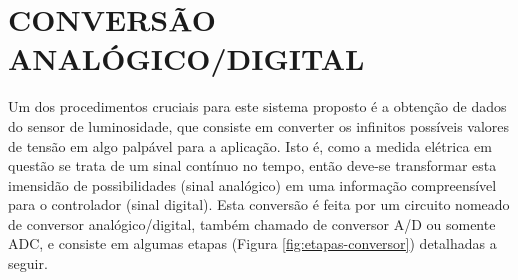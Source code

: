 \documentclass[oneside,openright,12pt]{ufsm_2015} %
\begin{document}


\section{CONVERSÃO ANALÓGICO/DIGITAL}
Um dos procedimentos cruciais para este sistema proposto é a obtenção de dados do sensor de luminosidade, que consiste em converter os infinitos possíveis valores de tensão em algo palpável para a aplicação. Isto é, como a medida elétrica em questão se trata de um sinal contínuo no tempo, então deve-se transformar esta imensidão de possibilidades (sinal analógico) em uma informação compreensível para o controlador (sinal digital). Esta conversão é
feita por um circuito nomeado de conversor analógico/digital, também chamado de conversor A/D ou somente ADC, e consiste em algumas etapas (Figura \ref{fig:etapas-conversor}) detalhadas a seguir.
\end{document}
